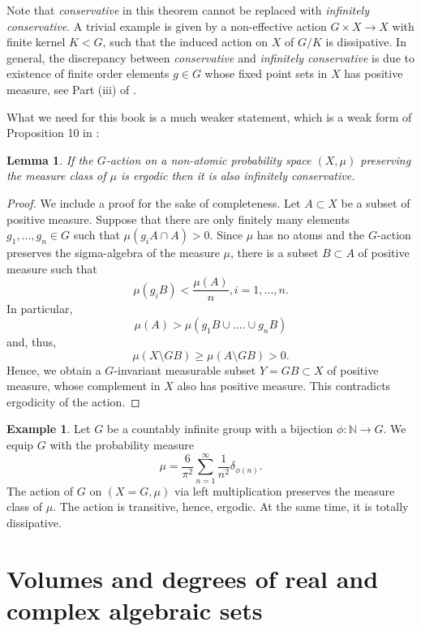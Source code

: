 \documentclass[12pt]{amsbook}%
\newtheorem{lem}[thm]{Lemma}
\theoremstyle{definition}
\newtheorem{example}[thm]{Example}
\theoremstyle{remark}
\numberwithin{section}{chapter}
\numberwithin{subsection}{section}
\numberwithin{figure}{chapter}
\def\bN{{\mathbb{N}}}
\begin{document}
{{Note that  {\em conservative} in this theorem cannot be replaced with {\em infinitely conservative}. A trivial example is given by a non-effective action 
$G\times X\to X$ with finite kernel $K< G$, such that the induced action on $X$ of $G/K$ is dissipative. In general, the discrepancy between 
{\em conservative} and {\em infinitely conservative} is due to existence of finite order elements $g\in G$ whose 
fixed point sets in $X$ has positive measure, see  Part (iii) of \cite[Theorem 14]{Kaimanovich}. 

\medskip 
What we need for this book is a much weaker statement, which is a weak form of Proposition 10 in \cite{Kaimanovich}:

\begin{lem}\label{lem:infinitely conservative} 
If the $G$-action on a non-atomic probability space $(X,\mu)$ preserving the measure class of $\mu$ is ergodic then it is also infinitely conservative. 
\end{lem}
\begin{proof} We include a proof for the sake of completeness. Let $A\subset X$ be a subset of positive measure. 
Suppose that there are only finitely many elements $g_1,...,g_n\in G$ such that $\mu(g_iA\cap A )> 0$. %
Since $\mu$ has no atoms and the $G$-action preserves the sigma-algebra of  the measure $\mu$, there is a subset $B\subset A$ of positive measure such that  
$$
\mu(g_i B)< \frac{\mu(A)}{n},  i=1,...,n.$$
In particular,
$$
\mu(A)> \mu(g_1B \cup ....\cup g_nB)
$$  
and, thus, 
$$
\mu(X\setminus GB)\geqslant \mu(A\setminus GB)>0. 
$$
Hence, we obtain a $G$-invariant measurable subset $Y=GB\subset X$ of positive measure, whose complement in $X$ 
also has positive measure. This contradicts ergodicity of the action.
\end{proof}
 
 
\begin{example}
Let $G$ be a countably infinite group with a bijection $\phi: \bN\to G$. We equip $G$ with the probability measure  
$$
\mu=\frac{6}{\pi^2}\sum_{n=1}^\infty \frac{1}{n^2}\delta_{\phi(n)}. 
$$
The action of $G$ on $(X=G,\mu)$ via left multiplication preserves the measure class of $\mu$. The action is transitive, hence, ergodic. At the same time, 
it is totally dissipative. 
\end{example} 
 
 

\section{Volumes and degrees of real and complex algebraic sets}
\label{appendix_volume_degree}

}}
\end{document}
